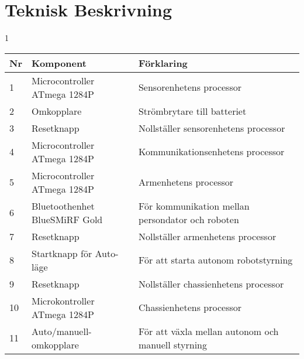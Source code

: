 
\section{Teknisk Beskrivning}
1

\begin{center}
    \begin{tabular}{| l | l | l |}
    \hline
   \textbf{Nr} &  \textbf{Komponent} &  \textbf{Förklaring} \\ \hline
    1 & Microcontroller ATmega 1284P & Sensorenhetens processor \\ \hline
 2 & Omkopplare & Strömbrytare till batteriet \\ \hline
 3 & Resetknapp & Nollställer sensorenhetens processor \\ \hline
 4 & Microcontroller ATmega 1284P & Kommunikationsenhetens processor \\ \hline
 5 & Microcontroller ATmega 1284P & Armenhetens processor \\ \hline
 6 & Bluetoothenhet BlueSMiRF Gold &  För kommunikation mellan persondator och roboten\\ \hline
 7 & Resetknapp & Nollställer armenhetens processor \\ \hline
 8 & Startknapp för Auto-läge & För att starta autonom robotstyrning \\ \hline
9 & Resetknapp & Nollställer chassienhetens processor \\ \hline
10 & Microkontroller ATmega 1284P & Chassienhetens processor \\ \hline
11 & Auto/manuell-omkopplare & För att växla mellan autonom och manuell styrning \\ \hline
    \end{tabular}
\end{center}

